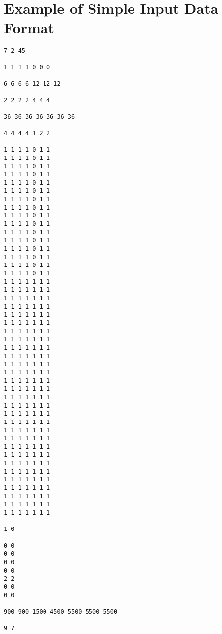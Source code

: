 \chapter{Example of Simple Input Data Format}\label{appx:input-file-simple}

\lstset{style=appendix-file-style}
\begin{lstlisting}
7 2 45

1 1 1 1 0 0 0

6 6 6 6 12 12 12

2 2 2 2 4 4 4

36 36 36 36 36 36 36

4 4 4 4 1 2 2

1 1 1 1 0 1 1
1 1 1 1 0 1 1
1 1 1 1 0 1 1
1 1 1 1 0 1 1
1 1 1 1 0 1 1
1 1 1 1 0 1 1
1 1 1 1 0 1 1
1 1 1 1 0 1 1
1 1 1 1 0 1 1
1 1 1 1 0 1 1
1 1 1 1 0 1 1
1 1 1 1 0 1 1
1 1 1 1 0 1 1
1 1 1 1 0 1 1
1 1 1 1 0 1 1
1 1 1 1 0 1 1
1 1 1 1 1 1 1
1 1 1 1 1 1 1
1 1 1 1 1 1 1
1 1 1 1 1 1 1
1 1 1 1 1 1 1
1 1 1 1 1 1 1
1 1 1 1 1 1 1
1 1 1 1 1 1 1
1 1 1 1 1 1 1
1 1 1 1 1 1 1
1 1 1 1 1 1 1
1 1 1 1 1 1 1
1 1 1 1 1 1 1
1 1 1 1 1 1 1
1 1 1 1 1 1 1
1 1 1 1 1 1 1
1 1 1 1 1 1 1
1 1 1 1 1 1 1
1 1 1 1 1 1 1
1 1 1 1 1 1 1
1 1 1 1 1 1 1
1 1 1 1 1 1 1
1 1 1 1 1 1 1
1 1 1 1 1 1 1
1 1 1 1 1 1 1
1 1 1 1 1 1 1
1 1 1 1 1 1 1
1 1 1 1 1 1 1
1 1 1 1 1 1 1

1 0

0 0
0 0
0 0
0 0
2 2
0 0
0 0

900 900 1500 4500 5500 5500 5500

9 7


\end{lstlisting}
